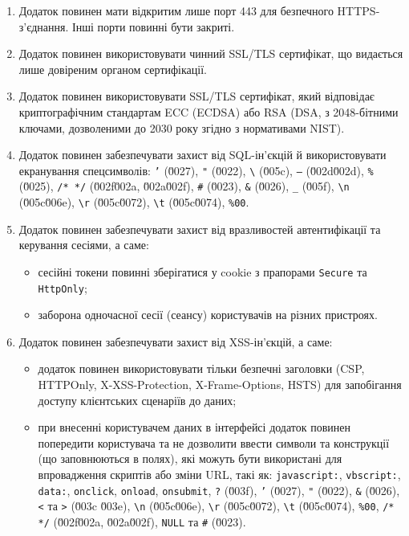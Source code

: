 \documentclass{article}
\begin{document}
\begin{enumerate}
  \item Додаток повинен мати відкритим лише порт 443 для безпечного HTTPS-з'єднання. Інші порти повинні бути закриті.

  \item Додаток повинен використовувати чинний SSL/TLS сертифікат, що видається лише довіреним органом сертифікації.

  \item Додаток повинен використовувати SSL/TLS сертифікат, який відповідає криптографічним стандартам ECC (ECDSA) або RSA (DSA, з 2048-бітними ключами, дозволеними до 2030 року згідно з нормативами NIST).

  \item Додаток повинен забезпечувати захист від SQL-ін'єкцій й використовувати екранування спецсимволів: 
  \texttt{'} (\u0027), \texttt{"} (\u0022), \texttt{\textbackslash} (\u005c), \texttt{--} (\u002d\u002d), \texttt{\%} (\u0025), \texttt{/* */} (\u002f\u002a, \u002a\u002f), \texttt{\#} (\u0023), \texttt{\&} (\u0026), \texttt{\_} (\u005f), \texttt{\textbackslash n} (\u005c\u006e), \texttt{\textbackslash r} (\u005c\u0072), \texttt{\textbackslash t} (\u005c\u0074), \texttt{\%00}.

  \item Додаток повинен забезпечувати захист від вразливостей автентифікації та керування сесіями, а саме:
    \begin{itemize}
      \item сесійні токени повинні зберігатися у cookie з прапорами \texttt{Secure} та \texttt{HttpOnly};
      \item заборона одночасної сесії (сеансу) користувачів на різних пристроях.
    \end{itemize}

  \item Додаток повинен забезпечувати захист від XSS-ін'єкцій, а саме:
    \begin{itemize}
      \item додаток повинен використовувати тільки безпечні заголовки (CSP, HTTPOnly, X-XSS-Protection, X-Frame-Options, HSTS) для запобігання доступу клієнтських сценаріїв до даних;
      \item при внесенні користувачем даних в інтерфейсі додаток повинен попередити користувача та не дозволити
           ввести символи та конструкції (що заповнюються в полях), які можуть бути використані для впровадження
           скриптів або зміни URL, такі як: \texttt{javascript:}, \texttt{vbscript:}, \texttt{data:}, \texttt{onclick},
           \texttt{onload}, \texttt{onsubmit}, \texttt{?} (\u003f), \texttt{'} (\u0027), \texttt{"}
           (\u0022), \texttt{\&} (\u0026), \texttt{<} та \texttt{>} (\u003c \u003e), \texttt{\textbackslash n}
           (\u005c\u006e), \texttt{\textbackslash r} (\u005c\u0072), \texttt{\textbackslash t} (\u005c\u0074),
           \texttt{\%00}, \texttt{/* */} (\u002f\u002a, \u002a\u002f), \texttt{NULL} та \texttt{\#} (\u0023).
    \end{itemize}


\end{enumerate}
\end{document}
